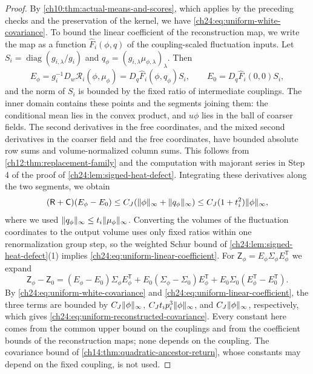 \begin{proof}
By \cref{ch10:thm:actual-means-and-scores}, which applies by the preceding checks and the preservation of the kernel, we have \eqref{ch24:eq:uniform-white-covariance}. To bound the linear coefficient of the reconstruction map, we write the map as a function $\widehat F_i(\phi,q)$ of the coupling-scaled fluctuation inputs. Let $S_i=\operatorname{diag}(g_{i,\lambda}/g_i)$ and $q_\phi=(g_{i,\lambda}\mu_{\phi,\lambda})_\lambda$. Then
\[
 E_\phi=g_i^{-1}D_w\mathscr R_i(\phi,\mu_\phi)=D_q\widehat F_i(\phi,q_\phi)S_i,\qquad E_0=D_q\widehat F_i(0,0)S_i,
\]
and the norm of $S_i$ is bounded by the fixed ratio of intermediate couplings. The inner domain contains these points and the segments joining them: the conditional mean lies in the convex product, and $u\phi$ lies in the ball of coarser fields. The second derivatives in the free coordinates, and the mixed second derivatives in the coarser field and the free coordinates, have bounded absolute row sums and volume-normalized column sums. This follows from \cref{ch12:thm:replacement-family} and the computation with majorant series in Step 4 of the proof of \cref{ch24:lem:signed-heat-defect}. Integrating these derivatives along the two segments, we obtain
\[
 (\mathsf R+\mathsf C)(E_\phi-E_0)\le C_J(\lVert \phi\rVert_\infty+\lVert q_\phi\rVert_\infty)\le C_J(1+t_i^2)\lVert \phi\rVert_\infty,
\]
where we used $\lVert q_\phi\rVert_\infty\le t_i\lVert \mu_\phi\rVert_\infty$. Converting the volumes of the fluctuation coordinates to the output volume uses only fixed ratios within one renormalization group step, so the weighted Schur bound of \cref{ch24:lem:signed-heat-defect}(1) implies \eqref{ch24:eq:uniform-linear-coefficient}. For $\mathsf Z_\phi=E_\phi\Sigma_\phi E_\phi^{\mathsf T}$ we expand
\begin{equation}\label{ch24:eq:reconstructed-covariance-expansion}
 \mathsf Z_\phi-\mathsf Z_0=(E_\phi-E_0)\Sigma_\phi E_\phi^{\mathsf T}+E_0(\Sigma_\phi-\Sigma_0)E_\phi^{\mathsf T}+E_0\Sigma_0(E_\phi^{\mathsf T}-E_0^{\mathsf T}).
\end{equation}
By \eqref{ch24:eq:uniform-white-covariance} and \eqref{ch24:eq:uniform-linear-coefficient}, the three terms are bounded by $C_J\lVert \phi\rVert_\infty$, $C_Jt_ip_i^3\lVert \phi\rVert_\infty$, and $C_J\lVert \phi\rVert_\infty$, respectively, which gives \eqref{ch24:eq:uniform-reconstructed-covariance}. Every constant here comes from the common upper bound on the couplings and from the coefficient bounds of the reconstruction maps; none depends on the coupling. The covariance bound of \cref{ch14:thm:quadratic-ancestor-return}, whose constants may depend on the fixed coupling, is not used.
\end{proof}

